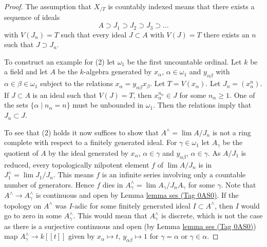\documentclass{amsart}
\theoremstyle{plain}
\theoremstyle{definition}
\theoremstyle{remark}
\numberwithin{equation}{subsection}
\def\lim{\mathop{\mathrm{lim}}\nolimits}
\begin{document}
\begin{proof}
The assumption that $X_{/T}$ is countably indexed means that there exists a
sequence of ideals
$$
A \supset J_1 \supset J_2 \supset J_3 \supset \ldots
$$
with $V(J_n) = T$ such that every ideal $J \subset A$ with $V(J) = T$
there exists an $n$ such that $J \supset J_n$.

\medskip\noindent
To construct an example for (2) let $\omega_1$ be the first uncountable
ordinal. Let $k$ be a field and let
$A$ be the $k$-algebra generated by $x_\alpha$, $\alpha \in \omega_1$
and $y_{\alpha \beta}$ with $\alpha \in \beta \in \omega_1$
subject to the relations $x_\alpha = y_{\alpha \beta} x_\beta$.
Let $T = V(x_\alpha)$. Let $J_n = (x_\alpha^n)$.
If $J \subset A$ is an ideal such that
$V(J) = T$, then $x_\alpha^{n_\alpha} \in J$ for some $n_\alpha \geq 1$.
One of the sets $\{\alpha \mid n_\alpha = n\}$ must be unbounded in
$\omega_1$. Then the relations imply that $J_n \subset J$.

\medskip\noindent
To see that (2) holds it now suffices to show that $A^\wedge = \lim A/J_n$
is not a ring complete with respect to a finitely generated ideal.
For $\gamma \in \omega_1$ let $A_\gamma$ be the quotient of $A$
by the ideal generated by $x_\alpha$, $\alpha \in \gamma$ and
$y_{\alpha \beta}$, $\alpha \in \gamma$. As $A/J_1$ is reduced,
every topologically nilpotent element $f$ of $\lim A/J_n$ is in
$J_1^\wedge = \lim J_1/J_n$. This means $f$ is an infinite series
involving only a countable number of generators. Hence $f$ dies in
$A_\gamma^\wedge = \lim A_\gamma/J_nA_\gamma$ for some $\gamma$.
Note that $A^\wedge \to A_\gamma^\wedge$ is continuous and open by
Lemma \href{https://stacks.math.columbia.edu/tag/0AS0}{lemma ses (Tag 0AS0)}.
If the topology on $A^\wedge$ was $I$-adic for some finitely generated ideal
$I \subset A^\wedge$, then $I$ would go to zero in some
$A_\gamma^\wedge$. This would mean that $A_\gamma^\wedge$ is discrete,
which is not the case as there is a surjective continuous and open
(by Lemma \href{https://stacks.math.columbia.edu/tag/0AS0}{lemma ses (Tag 0AS0)}) map
$A_\gamma^\wedge \to k[[t]]$ given by
$x_\alpha \mapsto t$, $y_{\alpha \beta} \mapsto 1$ for
$\gamma = \alpha$ or $\gamma \in \alpha$.


\end{proof}
\end{document}
